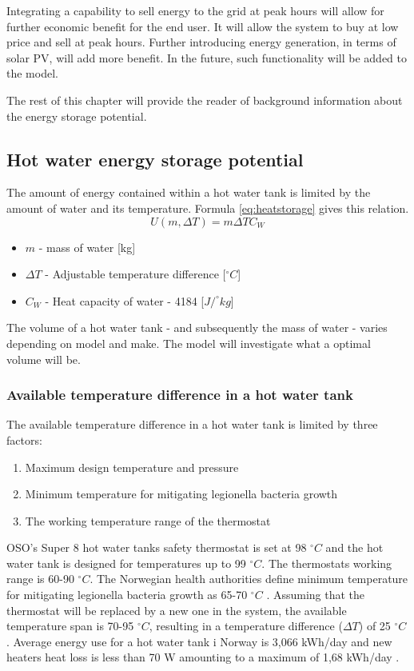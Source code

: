 \documentclass[11pt]{article} %
\begin{document}
Integrating a capability to sell energy to the grid at peak hours will allow for further economic benefit for the end user. It will allow the system to buy at low price and sell at peak hours. Further introducing energy generation, in terms of solar PV, will add more benefit. In the future, such functionality will be added to the model.

The rest of this chapter will provide the reader of background information about the energy storage potential.

\subsection{Hot water energy storage potential}
The amount of energy contained within a hot water tank is limited by the amount of water and its temperature. Formula \ref{eq:heatstorage} gives this relation.
\begin{equation} \label{eq:heatstorage}
U(m,\Delta T) = m \Delta T C_{W}
\end{equation}

\begin{itemize}
	\item $m$ - mass of water [kg]
	\item $\Delta T$ - Adjustable temperature difference [$^{\circ}C$]
	\item $C_{W}$ - Heat capacity of water - 4184 [$J/^{\circ}kg$]
\end{itemize}

The volume of a hot water tank - and subsequently the mass of water - varies depending on model and make. The model will investigate what a optimal volume will be.

\subsubsection{Available temperature difference in a hot water tank}
The available temperature difference in a hot water tank is limited by three factors:
\begin{enumerate}
	\item Maximum design temperature and pressure
	\item Minimum temperature for mitigating legionella bacteria growth
	\item The working temperature range of the thermostat 
\end{enumerate}

OSO's Super 8 hot water tanks safety thermostat is set at 98 $^{\circ}C$ and the hot water tank is designed for temperatures up to 99 $^{\circ}C$. The thermostats working range is 60-90 $^{\circ}C$. The Norwegian health authorities define minimum temperature for mitigating legionella bacteria growth as 65-70 $^{\circ}C$ \cite{Legionella2009}. Assuming that the thermostat will be replaced by a new one in the system, the available temperature span is 70-95 $^{\circ}C$, resulting in a temperature difference ($\Delta T$) of 25 $^{\circ}C$. Average energy use for a hot water tank i Norway is 3,066 kWh/day and new heaters heat loss is less than 70 W amounting to a maximum of  1,68 kWh/day \cite{EnergibrukHusholdning}.
\end{document}
